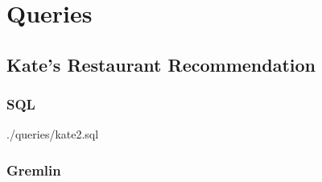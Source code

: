 \section{Queries}
\label{app:queries}

\subsection{Kate's Restaurant Recommendation}

\subsubsection{SQL}






{./queries/kate2.sql}


\subsubsection{Gremlin}

